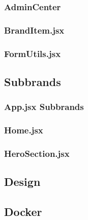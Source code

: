 \subsubsection{AdminCenter} \label{admincenter}

\subsubsection{BrandItem.jsx} \label{branditem}

\subsubsection{FormUtils.jsx} \label{formutils}


\subsection{Subbrands} \label{subbrands}

\subsubsection{App.jsx Subbrands} \label{appSubbrands}

\subsubsection{Home.jsx} \label{home}

\subsubsection{HeroSection.jsx} \label{herosection}


\subsection{Design} \label{styling}

\subsection{Docker} \label{dockermain}
